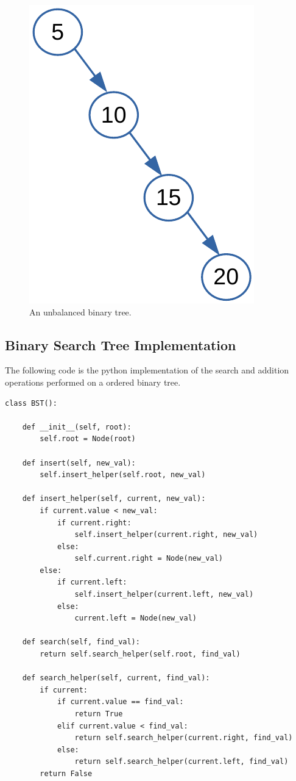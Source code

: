 \begin{figure}[H]
	\begin{center}
		\includegraphics[scale=.6]{chapters/trees/images/trees_15.pdf}
		\caption[An unbalanced binary tree.]{An unbalanced binary tree.}
		\label{trees_15}
	\end{center}
\end{figure}

\subsection{Binary Search Tree Implementation}
The following code is the python implementation of the search and addition operations performed on a ordered binary tree.

\begin{lstlisting}[firstnumber=1, caption={implementation of insert and search operation for a binary search tree.}]
class BST():

	def __init__(self, root):
		self.root = Node(root)

	def insert(self, new_val):
		self.insert_helper(self.root, new_val)
	
	def insert_helper(self, current, new_val):
		if current.value < new_val:
			if current.right:
				self.insert_helper(current.right, new_val)
			else:
				self.current.right = Node(new_val)
		else:
			if current.left:
				self.insert_helper(current.left, new_val)
			else:
				current.left = Node(new_val)
	
	def search(self, find_val):
		return self.search_helper(self.root, find_val)
	
	def search_helper(self, current, find_val):
		if current:
			if current.value == find_val:
				return True
			elif current.value < find_val:
				return self.search_helper(current.right, find_val)
			else:
				return self.search_helper(current.left, find_val)
		return False
\end{lstlisting}

